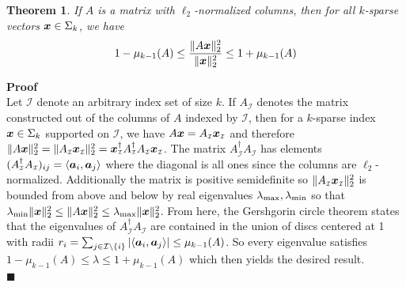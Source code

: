 \documentclass[twocolumn]{gwclass}
\newtheorem{theorem}{Theorem}[section]
\renewcommand\qedsymbol{$\blacksquare$}
\begin{document}
	\begin{theorem}
		If $A$ is a matrix with $\ell_2$-normalized columns, then for all $k$-sparse vectors $\boldsymbol{x}\in\Sigma_k$, we have
		$$ 1-\mu_{k-1}(A) \leq \frac{\|A\boldsymbol{x}\|_2^2}{\|\boldsymbol{x}\|_2^2} \leq 1 + \mu_{k-1}(A) $$
	\end{theorem}
	\noindent\textbf{Proof}\\
	Let $\mathcal{I}$ denote an arbitrary index set of size $k$. If $A_{\scriptscriptstyle\mathcal{I}}$ denotes the matrix constructed out of the columns of $A$ indexed by $\mathcal{I}$, then for a $k$-sparse index $\boldsymbol{x}\in\Sigma_k$ supported on $\mathcal{I}$, we have $A\boldsymbol{x}=A_{\scriptscriptstyle\mathcal{I}}\boldsymbol{x}_{\scriptscriptstyle\mathcal{I}}$ and therefore $\|A\boldsymbol{x}\|_2^2=\|A_{\scriptscriptstyle\mathcal{I}}\boldsymbol{x}_{\scriptscriptstyle\mathcal{I}}\|_2^2=\boldsymbol{x}^\dagger_{\scriptscriptstyle\mathcal{I}}A^\dagger_{\scriptscriptstyle\mathcal{I}}A_{\scriptscriptstyle\mathcal{I}}\boldsymbol{x}_{\scriptscriptstyle\mathcal{I}}$. The matrix $A_{\scriptscriptstyle\mathcal{I}}^\dagger A_{\scriptscriptstyle\mathcal{I}}$ has elements $(A_{\scriptscriptstyle\mathcal{I}}^\dagger A_{\scriptscriptstyle\mathcal{I}})_{ij}=\langle\boldsymbol{a}_i,\boldsymbol{a}_j\rangle$ where the diagonal is all ones since the columns are $\ell_2$-normalized. Additionally the matrix is positive semidefinite so $\|A_{\scriptscriptstyle\mathcal{I}}\boldsymbol{x}_{\scriptscriptstyle\mathcal{I}}\|_2^2$ is bounded from above and below by real eigenvalues $\lambda_{\text{\normalfont{max}}},\lambda_{\text{\normalfont{min}}}$ so that $\lambda_{\text{\normalfont{min}}}\|\boldsymbol{x}\|_2^2\leq\|A\boldsymbol{x}\|_2^2 \leq \lambda_{\text{\normalfont{max}}}\|\boldsymbol{x}\|_2^2$. From here, the Gershgorin circle theorem states that the eigenvalues of $A_{\scriptscriptstyle\mathcal{I}}^\dagger A_{\scriptscriptstyle\mathcal{I}}$ are contained in the union of discs centered at 1 with radii $r_i=\sum_{j\in\mathcal{I}\backslash\{i\}}|\langle\boldsymbol{a}_i,\boldsymbol{a}_j\rangle| \leq \mu_{k-1}(A)$. So every eigenvalue satisfies $1-\mu_{k-1}(A)\leq\lambda\leq 1+\mu_{k-1}(A)$ which then yields the desired result.
	\\\qedsymbol
	
	
\end{document}
